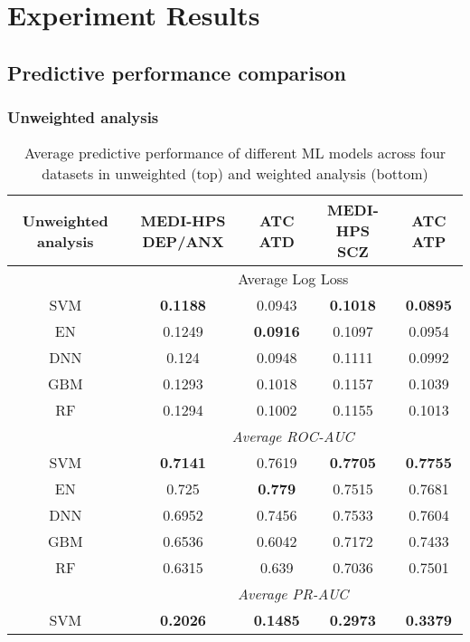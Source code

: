 \section{Experiment Results}
  \subsection{Predictive performance comparison}
    \subsubsection{Unweighted analysis }

      \begin{table}[htbp]
        \centering
        \begin{threeparttable}
        \caption{Average predictive performance of different ML models across four datasets in unweighted (top) and weighted analysis (bottom)}
          \begin{tabular}{c|cccc}
          \toprule
          \textbf{Unweighted analysis} & MEDI-HPS DEP/ANX & ATC ATD  & MEDI-HPS SCZ  & ATC ATP \\
          \midrule
                & \multicolumn{4}{c}{Average Log Loss}  \\
          SVM   & \textbf{0.1188} & 0.0943 & \textbf{0.1018} & \textbf{0.0895} \\
          EN    & 0.1249 & \textbf{0.0916} & 0.1097 & 0.0954 \\
          DNN   & 0.124 & 0.0948 & 0.1111 & 0.0992 \\
          GBM   & 0.1293 & 0.1018 & 0.1157 & 0.1039 \\
          RF    & 0.1294 & 0.1002 & 0.1155 & 0.1013 \\
                & \multicolumn{4}{c}{\textit{Average ROC-AUC}} \\
          SVM   & \textbf{0.7141} & 0.7619 & \textbf{0.7705} & \textbf{0.7755} \\
          EN    & 0.725 & \textbf{0.779} & 0.7515 & 0.7681 \\
          DNN   & 0.6952 & 0.7456 & 0.7533 & 0.7604 \\
          GBM   & 0.6536 & 0.6042 & 0.7172 & 0.7433 \\
          RF    & 0.6315 & 0.639 & 0.7036 & 0.7501 \\
                & \multicolumn{4}{c}{\textit{Average PR-AUC}} \\
          SVM   & \textbf{0.2026} & \textbf{0.1485} & \textbf{0.2973} & \textbf{0.3379} \\

\end{tabular}
\end{threeparttable}
\end{table}
